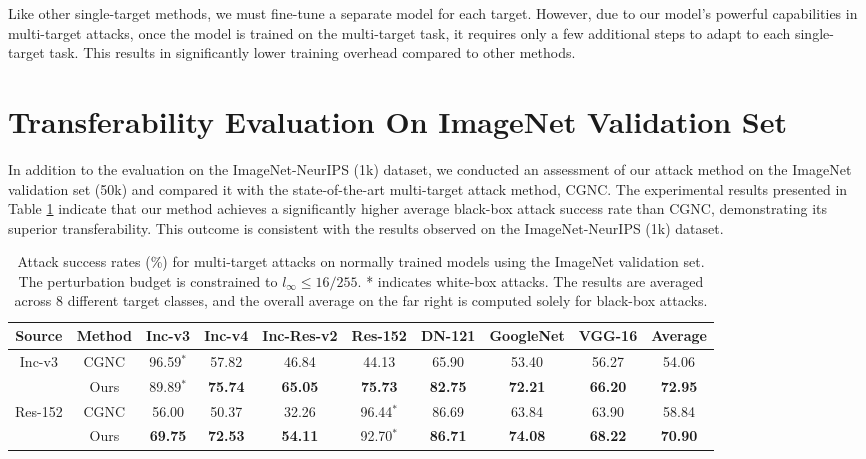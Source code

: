 Like other single-target methods, we must fine-tune a separate model for each target. However, due to our model's powerful capabilities in multi-target attacks, once the model is trained on the multi-target task, it requires only a few additional steps to adapt to each single-target task. This results in significantly lower training overhead compared to other methods.



\section{Transferability Evaluation On ImageNet Validation Set}
In addition to the evaluation on the ImageNet-NeurIPS (1k) dataset\cite{Nips2017}, we conducted an assessment of our attack method on the ImageNet validation set (50k)\cite{deng2009imagenet} and compared it with the state-of-the-art multi-target attack method, CGNC\cite{fang2025clip}. The experimental results presented in Table \ref{tab:imagenet_val} indicate that our method achieves a significantly higher average black-box attack success rate than CGNC, demonstrating its superior transferability. This outcome is consistent with the results observed on the ImageNet-NeurIPS (1k) dataset.

\begin{table}
  \centering
  \caption{Attack success rates (\%) for multi-target attacks on normally trained models using the ImageNet validation set. The perturbation budget is constrained to $l_{\infty} \leq 16/255$. * indicates white-box attacks. The results are averaged across 8 different target classes, and the overall average on the far right is computed solely for black-box attacks.}
 
  \vskip 0.15in
  \begin{small}
    \begin{sc}
    \begin{tabular}{c|c|c|c|c|c|c|c|c|c}
    \toprule 
    Source   & Method   & Inc-v3   & Inc-v4   & Inc-Res-v2    & Res-152  & DN-121   & GoogleNet       & VGG-16 & Average\\
    \hline
    \multirow{2}[0]{*}{Inc-v3} 
             & CGNC     & 96.59$^*$    & 57.82    & 46.84    & 44.13    & 65.90    & 53.40    & 56.27 & 54.06\\
             & Ours& 89.89$^*$& \textbf{75.74}&\textbf{65.05}&\textbf{75.73}&\textbf{82.75}&\textbf{72.21}&\textbf{66.20}&\textbf{72.95}\\
             \hline
    \multirow{2}[0]{*}{Res-152} 
             & CGNC     & 56.00    & 50.37    & 32.26    & 96.44$^*$    & 86.69    & 63.84    & 63.90 & 58.84\\
             & Ours&\textbf{69.75}&\textbf{72.53}&\textbf{54.11}&92.70$^*$&\textbf{86.71}&\textbf{74.08}&\textbf{68.22}&\textbf{70.90}\\
             \bottomrule
    \end{tabular}%
  \label{tab:imagenet_val}%
  \end{sc}
  \end{small}
    \vskip -0.1in
\end{table}%



